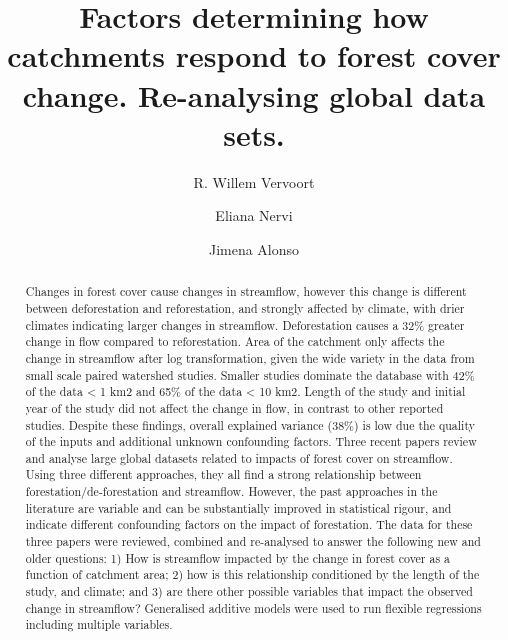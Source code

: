 \documentclass[]{elsarticle} %
\begin{document}
\begin{frontmatter}

  \title{Factors determining how catchments respond to forest cover change. Re-analysing global data sets.}
    \author[DARE, The University of Sydney]{R. Willem Vervoort}
    \author[INIA]{Eliana Nervi}
    \author[IMFIA]{Jimena Alonso}
      \address[DARE]{ARC Training Centre Data Analytics for Resources and the Environment}
    \address[The University of Sydney]{School of Life and Environmental Sciences, The University of Sydney, Sydney, NSW 2006, Australia}
    \address[INIA]{Project Manager, FPTA 357, Instituto Nacional de Investigación Agropecuaria, INIA-Uruguay, Ruta 48 km 10, Rincon del Colorado, 90100 Canelones, Uruguay}
    \address[IMFIA]{Institute of Fluid Mechanics and Environmental Engineering, School of Engineering, Universidad de la República, 11200 Montevideo, Uruguay}
  
  \begin{abstract}
  Changes in forest cover cause changes in streamflow, however this change is different between deforestation and reforestation, and strongly affected by climate, with drier climates indicating larger changes in streamflow. Deforestation causes a 32\% greater change in flow compared to reforestation. Area of the catchment only affects the change in streamflow after log transformation, given the wide variety in the data from small scale paired watershed studies. Smaller studies dominate the database with 42\% of the data \textless{} 1 km2 and 65\% of the data \textless{} 10 km2. Length of the study and initial year of the study did not affect the change in flow, in contrast to other reported studies. Despite these findings, overall explained variance (38\%) is low due the quality of the inputs and additional unknown confounding factors.
  Three recent papers review and analyse large global datasets related to impacts of forest cover on streamflow. Using three different approaches, they all find a strong relationship between forestation/de-forestation and streamflow. However, the past approaches in the literature are variable and can be substantially improved in statistical rigour, and indicate different confounding factors on the impact of forestation. The data for these three papers were reviewed, combined and re-analysed to answer the following new and older questions: 1) How is streamflow impacted by the change in forest cover as a function of catchment area; 2) how is this relationship conditioned by the length of the study, and climate; and 3) are there other possible variables that impact the observed change in streamflow? Generalised additive models were used to run flexible regressions including multiple variables.
  \end{abstract}
  
 \end{frontmatter}
\end{document}
